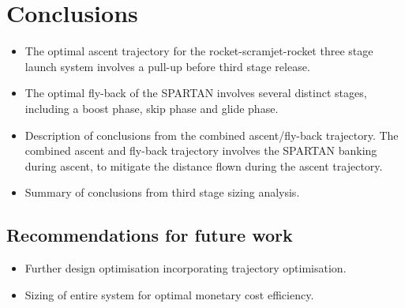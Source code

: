 
\cleardoublepage
\chapter{Conclusions}

\begin{itemize}
	\item The optimal ascent trajectory for the rocket-scramjet-rocket three stage launch system involves a pull-up before third stage release. 
	\item The optimal fly-back of the SPARTAN involves several distinct stages, including a boost phase, skip phase and glide phase. 
	\item Description of conclusions from the combined ascent/fly-back trajectory. The combined ascent and fly-back trajectory involves the SPARTAN banking during ascent, to mitigate the distance flown during the ascent trajectory. 
	\item Summary of conclusions from third stage sizing analysis. 
\end{itemize}

  \section{Recommendations for future work}

\begin{itemize}
	\item Further design optimisation incorporating trajectory optimisation.	
	\item Sizing of entire system for optimal monetary cost efficiency. 
\end{itemize}